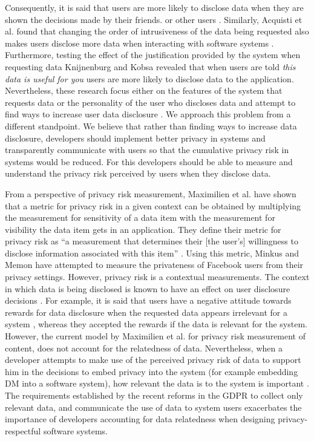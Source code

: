 \documentclass[10pt]{article}
\begin{document}
Consequently, it is said that users are more likely to disclose data when they are shown the decisions made by their friends. \cite {dennett2000little} or other users \cite {besmer2010impact}. Similarly, Acquisti et al. found that changing the order of intrusiveness of the data being requested also makes users disclose more data when interacting with software systems \cite {acquisti2012impact}. Furthermore, testing the effect of the justification provided by the system when requesting data Knijnenburg and Kobsa \cite {knijnenburg2013helping} revealed that when users are told \textit{this data is useful for you} users are more likely to disclose data to the application. Nevertheless, these research focus either on the features of the system that requests data \cite {li2010understanding, wang2016context, malheiros2013fairly} or the personality of the user who discloses data \cite {nissenbaum2009privacy} and attempt to find ways to increase user data disclosure \cite {dennett2000little}. We approach this problem from a different standpoint. We believe that rather than finding ways to increase data disclosure, developers should implement better privacy in systems and transparently communicate with users so that the cumulative privacy risk in systems would be reduced. For this developers should be able to measure and understand the privacy risk perceived by users when they disclose data.

From a perspective of privacy risk measurement, Maximilien et al. \cite {maximilien2009privacy} have shown that a metric for privacy risk in a given context can be obtained by multiplying the measurement for sensitivity of a data item with the measurement for visibility the data item gets in an application. They define their metric for privacy risk as \enquote{a measurement that determines their [the user's] willingness to disclose information associated with this item} \cite {maximilien2009privacy}. Using this metric, Minkus and Memon \cite{minkus2014scale} have attempted to measure the privateness of Facebook users from their privacy settings. However, privacy risk is a contextual measurements. The context in which data is being disclosed \cite {nissenbaum2009privacy, john2010strangers} is known to have an effect on user disclosure decisions \cite {knijnenburg2013making, malheiros2013fairly}. For example, it is said that users have a negative attitude towards rewards for data disclosure when the requested data appears irrelevant for a system \cite {li2010understanding}, whereas they accepted the rewards if the data is relevant for the system. However, the current model by Maximilien et al. \cite {maximilien2009privacy} for privacy risk measurement of content, does not account for the relatedness of data. Nevertheless, when a developer attempts to make use of the perceived privacy risk of data to support him in the decisions to embed privacy into the system (for example embedding DM into a software system), how relevant the data is to the system is important \cite {senarath2018under}. The requirements established by the recent reforms in the GDPR to collect only relevant data, and communicate the use of data to system users \cite {wagner2016national} exacerbates the importance of developers accounting for data relatedness when designing privacy-respectful software systems.
\end{document}
